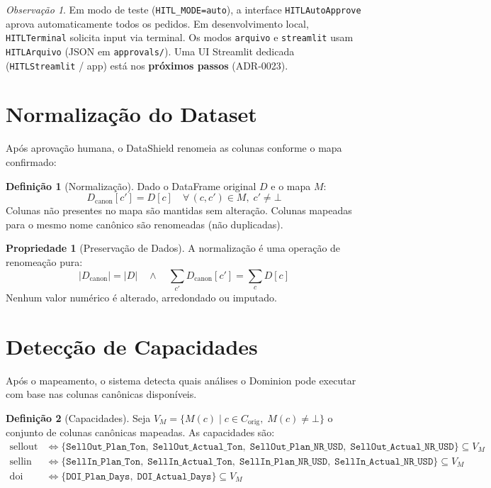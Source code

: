 \documentclass[a4paper, 12pt]{report}
\theoremstyle{definition}
\newtheorem{definicao}{Defini\c{c}\~ao}[chapter]
\newtheorem{propriedade}{Propriedade}[chapter]
\theoremstyle{remark}
\newtheorem{observacao}{Observa\c{c}\~ao}[chapter]
\begin{document}
\begin{observacao}
  Em modo de teste (\texttt{HITL\_MODE=auto}), a interface
  \texttt{HITLAutoApprove} aprova automaticamente todos os pedidos.
  Em desenvolvimento local, \texttt{HITLTerminal} solicita input
  via terminal. Os modos \texttt{arquivo} e \texttt{streamlit}
  usam \texttt{HITLArquivo} (JSON em \texttt{approvals/}).
  Uma UI Streamlit dedicada (\texttt{HITLStreamlit} / app) est\'a
  nos \textbf{pr\'oximos passos} (ADR-0023).
\end{observacao}


\section{Normaliza\c{c}\~ao do Dataset}

Ap\'os aprova\c{c}\~ao humana, o DataShield renomeia as colunas
conforme o mapa confirmado:

\begin{definicao}[Normaliza\c{c}\~ao]
  Dado o DataFrame original $D$ e o mapa $M$:
  \[
    D_{\text{canon}}[c'] = D[c] \quad \forall\, (c, c') \in M,\; c' \neq \bot
  \]
  Colunas n\~ao presentes no mapa s\~ao mantidas sem altera\c{c}\~ao.
  Colunas mapeadas para o mesmo nome can\^onico s\~ao renomeadas
  (n\~ao duplicadas).
\end{definicao}

\begin{propriedade}[Preserva\c{c}\~ao de Dados]
  A normaliza\c{c}\~ao \'e uma opera\c{c}\~ao de renomea\c{c}\~ao pura:
  \[
    |D_{\text{canon}}| = |D| \quad \land \quad
    \sum_{c'} D_{\text{canon}}[c'] = \sum_{c} D[c]
  \]
  Nenhum valor num\'erico \'e alterado, arredondado ou imputado.
\end{propriedade}


\section{Detec\c{c}\~ao de Capacidades}

Ap\'os o mapeamento, o sistema detecta quais an\'alises o Dominion
pode executar com base nas colunas can\^onicas dispon\'iveis.

\begin{definicao}[Capacidades]
  Seja $V_M = \{M(c) \mid c \in C_{\text{orig}},\; M(c) \neq \bot\}$
  o conjunto de colunas can\^onicas mapeadas. As capacidades s\~ao:
  \begin{align}
    \text{sellout} &\iff
      \{\texttt{SellOut\_Plan\_Ton},\; \texttt{SellOut\_Actual\_Ton},\;
       \texttt{SellOut\_Plan\_NR\_USD},\; \texttt{SellOut\_Actual\_NR\_USD}\}
      \subseteq V_M \\[4pt]
    \text{sellin}  &\iff
      \{\texttt{SellIn\_Plan\_Ton},\; \texttt{SellIn\_Actual\_Ton},\;
       \texttt{SellIn\_Plan\_NR\_USD},\; \texttt{SellIn\_Actual\_NR\_USD}\}
      \subseteq V_M \\[4pt]
    \text{doi}     &\iff
      \{\texttt{DOI\_Plan\_Days},\; \texttt{DOI\_Actual\_Days}\}
      \subseteq V_M
  \end{align}
\end{definicao}
\end{document}
